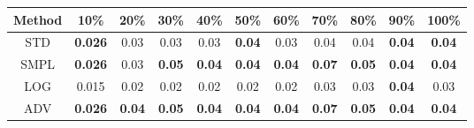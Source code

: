 \documentclass{standalone}
\begin{document}
\begin{tabular}{c|cccccccccc}
      \toprule
      Method & 10\% & 20\% & 30\% & 40\% & 50\% & 60\% & 70\% & 80\% & 90\% & 100\% \\
      \midrule
STD & \textbf{0.026} & 0.03 & 0.03 & 0.03 & \textbf{0.04} & 0.03 & 0.04 & 0.04 & \textbf{0.04} & \textbf{0.04}\\
SMPL & \textbf{0.026} & 0.03 & \textbf{0.05} & \textbf{0.04} & \textbf{0.04} & \textbf{0.04} & \textbf{0.07} & \textbf{0.05} & \textbf{0.04} & \textbf{0.04}\\
LOG & 0.015 & 0.02 & 0.02 & 0.02 & 0.02 & 0.02 & 0.03 & 0.03 & \textbf{0.04} & 0.03\\
ADV & \textbf{0.026} & \textbf{0.04} & \textbf{0.05} & \textbf{0.04} & \textbf{0.04} & \textbf{0.04} & \textbf{0.07} & \textbf{0.05} & \textbf{0.04} & \textbf{0.04}\\
  \bottomrule
\end{tabular}
\end{document}
